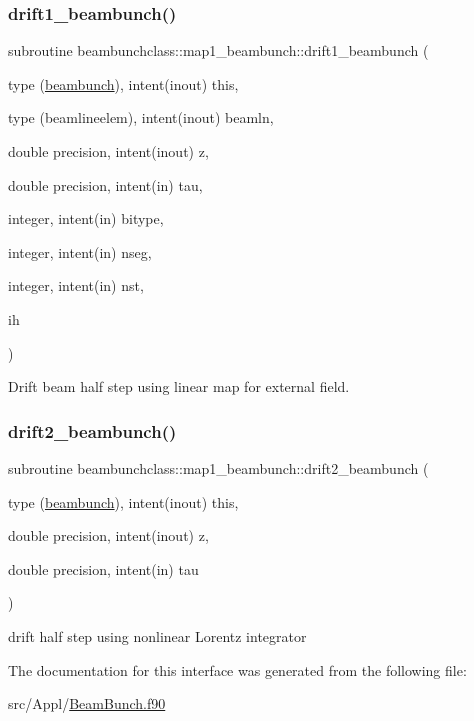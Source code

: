 \subsubsection{\texorpdfstring{drift1\_beambunch()}{drift1\_beambunch()}}
{\footnotesize\ttfamily subroutine beambunchclass\+::map1\+\_\+beambunch\+::drift1\+\_\+beambunch (\begin{DoxyParamCaption}\item[{type (\mbox{\hyperlink{namespacebeambunchclass_structbeambunchclass_1_1beambunch}{beambunch}}), intent(inout)}]{this,  }\item[{type (beamlineelem), intent(inout)}]{beamln,  }\item[{double precision, intent(inout)}]{z,  }\item[{double precision, intent(in)}]{tau,  }\item[{integer, intent(in)}]{bitype,  }\item[{integer, intent(in)}]{nseg,  }\item[{integer, intent(in)}]{nst,  }\item[{}]{ih }\end{DoxyParamCaption})}



Drift beam half step using linear map for external field. 

\mbox{\label{interfacebeambunchclass_1_1map1__beambunch_a5f0061ebcef646b860c6d44c6f93407c}} 
\subsubsection{\texorpdfstring{drift2\_beambunch()}{drift2\_beambunch()}}
{\footnotesize\ttfamily subroutine beambunchclass\+::map1\+\_\+beambunch\+::drift2\+\_\+beambunch (\begin{DoxyParamCaption}\item[{type (\mbox{\hyperlink{namespacebeambunchclass_structbeambunchclass_1_1beambunch}{beambunch}}), intent(inout)}]{this,  }\item[{double precision, intent(inout)}]{z,  }\item[{double precision, intent(in)}]{tau }\end{DoxyParamCaption})}



drift half step using nonlinear Lorentz integrator 



The documentation for this interface was generated from the following file\+:\begin{DoxyCompactItemize}
\item 
src/\+Appl/\mbox{\hyperlink{_beam_bunch_8f90}{Beam\+Bunch.\+f90}}\end{DoxyCompactItemize}
